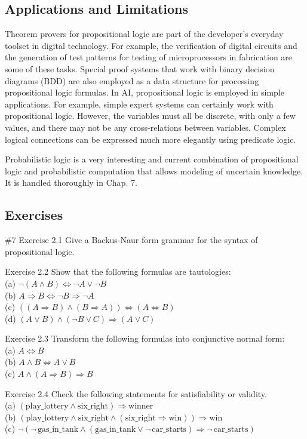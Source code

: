 \documentclass[10pt]{book}
\begin{document}
\subsection{Applications and Limitations}
Theorem provers for propositional logic are part of the developer's everyday toolset in digital technology. For example, the verification of digital circuits and the generation of test patterns for testing of microprocessors in fabrication are some of these tasks. Special proof systems that work with binary decision diagrams (BDD) are also employed as a data structure for processing propositional logic formulas.
In AI, propositional logic is employed in simple applications. For example, simple expert systems can certainly work with propositional logic. However, the variables must all be discrete, with only a few values, and there may not be any cross-relations between variables. Complex logical connections can be expressed much more elegantly using predicate logic.

Probabilistic logic is a very interesting and current combination of propositional logic and probabilistic computation that allows modeling of uncertain knowledge. It is handled thoroughly in Chap. 7.

\subsection{Exercises}
\#7 Exercise 2.1 Give a Backus-Naur form grammar for the syntax of propositional logic.

Exercise 2.2 Show that the following formulas are tautologies:\\
(a) $\neg(A \wedge B) \Leftrightarrow \neg A \vee \neg B$\\
(b) $A \Rightarrow B \Leftrightarrow \neg B \Rightarrow \neg A$\\
(c) $((A \Rightarrow B) \wedge(B \Rightarrow A)) \Leftrightarrow(A \Leftrightarrow B)$\\
(d) $(A \vee B) \wedge(\neg B \vee C) \Rightarrow(A \vee C)$

Exercise 2.3 Transform the following formulas into conjunctive normal form:\\
(a) $A \Leftrightarrow B$\\
(b) $A \wedge B \Leftrightarrow A \vee B$\\
(c) $A \wedge(A \Rightarrow B) \Rightarrow B$

Exercise 2.4 Check the following statements for satisfiability or validity.\\
(a) $(\text{play\_lottery} \wedge \text{six\_right}) \Rightarrow \text{winner}$\\
(b) $(\text{play\_lottery} \wedge \text{six\_right} \wedge (\text{six\_right} \Rightarrow \text{win})) \Rightarrow \text{win}$\\
(c) $\neg(\neg\,\text{gas\_in\_tank} \wedge (\text{gas\_in\_tank} \vee \neg\,\text{car\_starts}) \Rightarrow \neg\,\text{car\_starts})$
\end{document}
